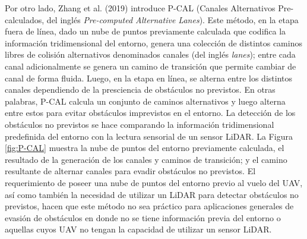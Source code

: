 Por otro lado, Zhang et al. (2019) \cite{Zhang2019} introduce P-CAL (Canales Alternativos Pre-calculados, del inglés \textit{Pre-computed Alternative Lanes}). Este método, en la etapa fuera de línea, dado un nube de puntos previamente calculada que codifica la información tridimensional del entorno, genera una colección de distintos caminos libres de colisión alternativos denominados canales (del inglés \textit{lanes}); entre cada canal adicionalmente se genera un camino de transición que permite cambiar de canal de forma fluida. Luego, en la etapa en línea, se alterna entre los distintos canales dependiendo de la presciencia de obstáculos no previstos. En otras palabras, P-CAL calcula un conjunto de caminos alternativos y luego alterna entre estos para evitar obstáculos imprevistos en el entorno. La detección de los obstáculos no previstos se hace comparando la información tridimensional predefinida del entorno con la lectura sensorial de un sensor LiDAR. La Figura \ref{fig:P-CAL} muestra la nube de puntos del entorno previamente calculada, el resultado de la generación de los canales y caminos de transición; y el camino resultante de alternar canales para evadir obstáculos no previstos. El requerimiento de poseer una nube de puntos del entorno previo al vuelo del UAV, así como también la necesidad de utilizar un LiDAR para detectar obstáculos no previstos, hacen que este método no sea práctico para aplicaciones generales de evasión de obstáculos en donde no se tiene información previa del entorno o aquellas cuyos UAV no tengan la capacidad de utilizar un sensor LiDAR. 

